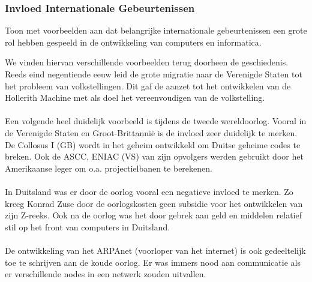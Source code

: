 \documentclass[../main.tex]{subfiles}
\begin{document}
\subsubsection{Invloed Internationale Gebeurtenissen}
\begin{question}
Toon met voorbeelden aan dat belangrijke internationale gebeurtenissen een grote rol hebben gespeeld in de ontwikkeling van computers en informatica.
\end{question}
\begin{solution}
We vinden hiervan verschillende voorbeelden terug doorheen de geschiedenis.
Reeds eind negentiende eeuw leid de grote migratie naar de Verenigde Staten tot het probleem van volkstellingen.
Dit gaf de aanzet tot het ontwikkelen van de Hollerith Machine met als doel het vereenvoudigen van de volkstelling.
\\\\
Een volgende heel duidelijk voorbeeld is tijdens de tweede wereldoorlog.
Vooral in de Verenigde Staten en Groot-Brittanni\"e is de invloed zeer duidelijk te merken.
De Collosus I (GB) wordt in het geheim ontwikkeld om Duitse geheime codes te breken.
Ook de ASCC, ENIAC (VS) van zijn opvolgers werden gebruikt door het Amerikaanse leger om o.a. projectielbanen te berekenen.
\\\\
In Duitsland was er door de oorlog vooral een negatieve invloed te merken.
Zo kreeg Konrad Zuse door de oorlogskosten geen subsidie voor het ontwikkelen van zijn Z-reeks.
Ook na de oorlog was het door gebrek aan geld en middelen relatief stil op het front van computers in Duitsland.
\\\\
De ontwikkeling van het ARPAnet (voorloper van het internet) is ook gedeeltelijk toe te schrijven aan de koude oorlog.
Er was immers nood aan communicatie als er verschillende nodes in een netwerk zouden uitvallen.
\end{solution}
\end{document}

